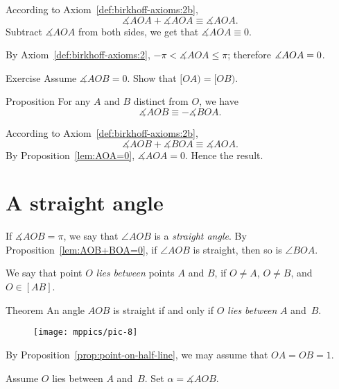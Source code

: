 According to Axiom~\ref{def:birkhoff-axioms:2b},
$$\measuredangle A O A
+
\measuredangle A O A 
\equiv
\measuredangle A O A.$$
Subtract  $\measuredangle A O A$ from both sides, we get that
$\measuredangle A O A \equiv 0$.

By Axiom~\ref{def:birkhoff-axioms:2}, $-\pi<\measuredangle A O A\le \pi$;
therefore $\measuredangle A O A = 0$.
\qeds

\begin{thm}{Exercise}\label{ex:2.4} 
Assume $\measuredangle A O B= 0$.
Show that $[OA)=[OB)$.
\end{thm}

\begin{thm}[\abs]{Proposition}\label{lem:AOB+BOA=0}
For any $A$ and $B$ distinct from $O$,
we have 
$$\measuredangle A O B\equiv-\measuredangle B O A.$$

\end{thm}

According to Axiom~\ref{def:birkhoff-axioms:2b},
$$\measuredangle A O B+\measuredangle B O A \equiv\measuredangle A O A.$$
By Proposition~\ref{lem:AOA=0}, $\measuredangle A O A=0$.
Hence the result.
\qeds

\section{A straight angle}

If $\measuredangle A O B=\pi$,
we say that $\angle A O B$ is a 
\emph{straight angle}.
By Proposition~\ref{lem:AOB+BOA=0}, 
if $\angle A O B$ is straight,
then so is $\angle B O A$.

We say that point $O$ \emph{lies between} points $A$ and $B$, 
if $O\not= A$, $O\not= B$, and $O\in[A B]$.

\begin{thm}[\abs]{Theorem}\label{thm:straight-angle}
An angle $A O B$ is straight 
if and only if $O$ 
\emph{lies between} $A$ and~$B$.
\end{thm}

\begin{wrapfigure}{r}{40mm}
\centering
\vskip-8mm
\texttt{[image: mppics/pic-8]}
\end{wrapfigure}

By Proposition~\ref{prop:point-on-half-line},  we may assume that
$O A = O B = 1$.

Assume $O$  
lies between $A$ and~$B$.
Set  $\alpha=\measuredangle A O B$.

